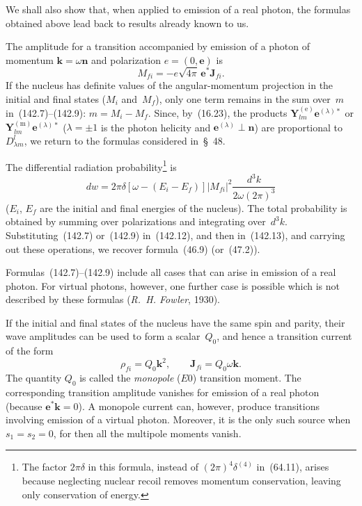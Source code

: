 We shall also show that, when applied to emission of a real photon, the formulas obtained above lead back to results already known to us.

The amplitude for a transition accompanied by emission of a photon of momentum $\mathbf k=\omega\mathbf n$ and polarization $e=(0,\mathbf e)$ is
\begin{equation}
M_{fi}=-e\sqrt{4\pi}\,\mathbf e^*\mathbf J_{fi}.
\tag{142.12}
\end{equation}
If the nucleus has definite values of the angular-momentum projection in the initial and final states ($M_i$ and~$M_f$), only one term remains in the sum over~$m$ in~(142.7)--(142.9): $m=M_i-M_f$. Since, by~(16.23), the products $\mathbf Y_{lm}^{(\mathrm e)}\mathbf e^{(\lambda)*}$ or $\mathbf Y_{lm}^{(\mathrm m)}\mathbf e^{(\lambda)*}$ ($\lambda=\pm1$ is the photon helicity and $\mathbf e^{(\lambda)}\perp\mathbf n$) are proportional to $D_{\lambda m}^l$, we return to the formulas considered in~\S~48.

The differential radiation probability\footnote{The factor $2\pi\delta$ in this formula, instead of $(2\pi)^4\delta^{(4)}$ in~(64.11), arises because neglecting nuclear recoil removes momentum conservation, leaving only conservation of energy.} is
\begin{equation}
dw=2\pi\delta[\omega-(E_i-E_f)]|M_{fi}|^2\frac{d^3k}{2\omega(2\pi)^3}
\tag{142.13}
\end{equation}
($E_i$, $E_f$ are the initial and final energies of the nucleus). The total probability is obtained by summing over polarizations and integrating over~$d^3k$. Substituting~(142.7) or~(142.9) in~(142.12), and then in~(142.13), and carrying out these operations, we recover formula~(46.9) (or~(47.2)).

Formulas~(142.7)--(142.9) include all cases that can arise in emission of a real photon. For virtual photons, however, one further case is possible which is not described by these formulas (\emph{R.~H. Fowler}, 1930).

If the initial and final states of the nucleus have the same spin and parity, their wave amplitudes can be used to form a scalar~$Q_0$, and hence a transition current of the form
\begin{equation}
\rho_{fi}=Q_0\mathbf k^2,\qquad \mathbf J_{fi}=Q_0\omega\mathbf k.
\tag{142.14}
\end{equation}
The quantity $Q_0$ is called the \emph{monopole} ($E0$) transition moment. The corresponding transition amplitude vanishes for emission of a real photon (because $\mathbf e^*\mathbf k=0$). A monopole current can, however, produce transitions involving emission of a virtual photon. Moreover, it is the only such source when $s_1=s_2=0$, for then all the multipole moments vanish.

